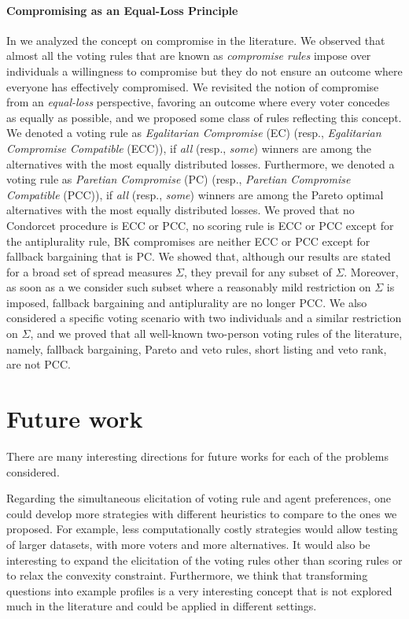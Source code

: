 \paragraph{Compromising as an Equal-Loss Principle}
In  we analyzed the concept on compromise in the literature. 
We observed that almost all the voting rules that are known as \textit{compromise rules} impose over individuals a willingness to compromise but they do not ensure an outcome where everyone has effectively compromised. 
We revisited the notion of compromise from an \emph{equal-loss} perspective, favoring an outcome where every voter concedes as equally as possible, and we proposed some class of rules reflecting this concept.
We denoted a voting rule as \textit{Egalitarian Compromise} (EC) (resp., \textit{Egalitarian Compromise Compatible} (ECC)), if \emph{all} (resp., \emph{some}) winners are among the alternatives with the most equally distributed losses.
Furthermore, we denoted a voting rule as \textit{Paretian Compromise} (PC) (resp., \textit{Paretian Compromise Compatible} (PCC)), if \emph{all} (resp., \emph{some}) winners are among the Pareto optimal alternatives with the most equally distributed losses.
We proved that no Condorcet procedure is ECC or PCC, no scoring rule is ECC or PCC except for the antiplurality rule, \acs{BK} compromises are neither ECC or PCC except for fallback bargaining that is PC.
We showed that, although our results are stated for a broad set of spread measures $\Sigma$, they prevail for any subset of $\Sigma$. Moreover, as soon as a we consider such subset where a reasonably mild restriction on $\Sigma$ is imposed, fallback bargaining and antiplurality are no longer PCC. 
We also considered a specific voting scenario with two individuals and a similar restriction on $\Sigma$, and we proved that all well-known two-person voting rules of the literature, namely, fallback bargaining, Pareto and veto rules, short listing and veto rank, are not PCC.


\section{Future work}
There are many interesting directions for future works for each of the problems considered.

Regarding the simultaneous elicitation of voting rule and agent preferences, one could develop more strategies with different heuristics to compare to the ones we proposed. For example, less computationally costly strategies would allow testing of larger datasets, with more voters and more alternatives. 
It would also be interesting to expand the elicitation of the voting rules other than scoring rules or to relax the convexity constraint. 
Furthermore, we think that transforming questions into example profiles is a very interesting concept that is not explored much in the literature and could be applied in different settings. 

